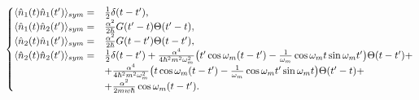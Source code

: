 \begin{equation}\label{noises}
 \begin{cases}
  \langle\hat{n}_1(t)\hat{n}_1(t')\rangle_{sym}=&\frac{1}{2}\delta(t-t'),\\
  \langle\hat{n}_1(t)\hat{n}_2(t')\rangle_{sym}=&\frac{\alpha^2}{2\hbar}G(t'-t)\Theta(t'-t),\\
  \langle\hat{n}_2(t)\hat{n}_1(t')\rangle_{sym}=&\frac{\alpha^2}{2\hbar}G(t-t')\Theta(t-t'),\\
  \langle\hat{n}_2(t)\hat{n}_2(t')\rangle_{sym}=&\frac{1}{2}\delta(t-t')+\frac{\alpha^4}{4\hbar^2 m^2 \omega_m^2}\bigl(t'\cos\omega_m(t-t')-\frac{1}{\omega_m}\cos\omega_mt\sin\omega_mt'\bigr)\Theta(t-t')+\\
&+\frac{\alpha^4}{4\hbar^2 m^2 \omega_m^2}\bigl(t\cos\omega_m(t-t')-\frac{1}{\omega_m}\cos\omega_mt'\sin\omega_mt\bigr)\Theta(t'-t)+\\&+ \frac{\alpha^2}{2 m w \hbar}\cos\omega_m(t-t').
 \end{cases}
\end{equation}

